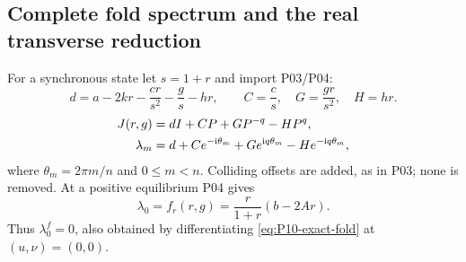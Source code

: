 \documentclass[11pt]{article}
\newcommand{\ii}{\mathrm{i}}
\theoremstyle{definition}
\theoremstyle{remark}
\begin{document}
\subsection{Complete fold spectrum and the real transverse reduction}

For a synchronous state let $s=1+r$ and import P03/P04:
\[
 d=a-2kr-\frac{cr}{s^2}-\frac gs-hr,\qquad
 C=\frac cs,\quad G=\frac{gr}{s^2},\quad H=hr.
\]
\begin{align}
 J(r,g)&=dI+CP+GP^{-q}-HP^q,\notag\\
 \lambda_m&=d+Ce^{-\ii\theta_m}+Ge^{\ii q\theta_m}-He^{-\ii q\theta_m},
 \label{eq:P10-spectrum}
\end{align}
where $\theta_m=2\pi m/n$ and $0\le m<n$.
Colliding offsets are added, as in P03; none is removed.
At a positive equilibrium P04 gives
\begin{equation}
 \lambda_0=f_r(r,g)=\frac r{1+r}(b-2Ar).
 \label{eq:P10-uniform}
\end{equation}
Thus $\lambda_0^f=0$, also obtained by differentiating
\eqref{eq:P10-exact-fold} at $(u,\nu)=(0,0)$.
\end{document}

